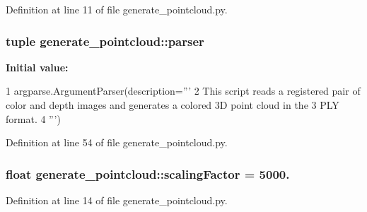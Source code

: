 \-Definition at line 11 of file generate\-\_\-pointcloud.\-py.

\subsubsection[{parser}]{\setlength{\rightskip}{0pt plus 5cm}tuple {\bf generate\-\_\-pointcloud\-::parser}}\label{namespacegenerate__pointcloud_a3bbd0f4cf7c122f27522a534923435dd}
{\bfseries \-Initial value\-:}
\begin{DoxyCode}
1 argparse.ArgumentParser(description='''
2     This script reads a registered pair of color and depth images and generates
       a colored 3D point cloud in the
3     PLY format. 
4     ''')
\end{DoxyCode}


\-Definition at line 54 of file generate\-\_\-pointcloud.\-py.

\subsubsection[{scaling\-Factor}]{\setlength{\rightskip}{0pt plus 5cm}float {\bf generate\-\_\-pointcloud\-::scaling\-Factor} = 5000.}\label{namespacegenerate__pointcloud_a53e41ec28cdc87e041fc3fcc5b63261e}


\-Definition at line 14 of file generate\-\_\-pointcloud.\-py.

